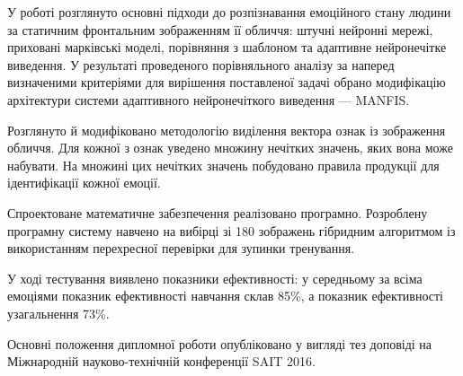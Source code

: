 \conclusions


У роботі розглянуто основні підходи до розпізнавання емоційного стану людини за
статичним фронтальним зображенням її обличчя: штучні нейронні мережі, приховані
марківські моделі, порівняння з шаблоном та адаптивне нейронечітке виведення. У
результаті проведеного порівняльного аналізу за наперед визначеними критеріями
для вирішення поставленої задачі обрано модифікацію архітектури системи
адаптивного нейронечіткого виведення --- MANFIS.
	
Розглянуто й модифіковано методологію виділення вектора ознак із зображення
обличчя. Для кожної з ознак уведено множину нечітких значень, яких вона може
набувати. На множині цих нечітких значень побудовано правила продукції для
ідентифікації кожної емоції.
	
Спроектоване математичне забезпечення реалізовано програмно. 	Розроблену
програмну систему навчено на вибірці зі 180 зображень гібридним алгоритмом із
використанням перехресної перевірки для зупинки тренування.
	
У ході тестування виявлено показники ефективності: у середньому за всіма
емоціями показник ефективності навчання склав 85\%, а показник ефективності
узагальнення 73\%.
	
Основні положення дипломної роботи опубліковано у вигляді тез доповіді на
Міжнародній науково-технічній конференції SAIT 2016.
